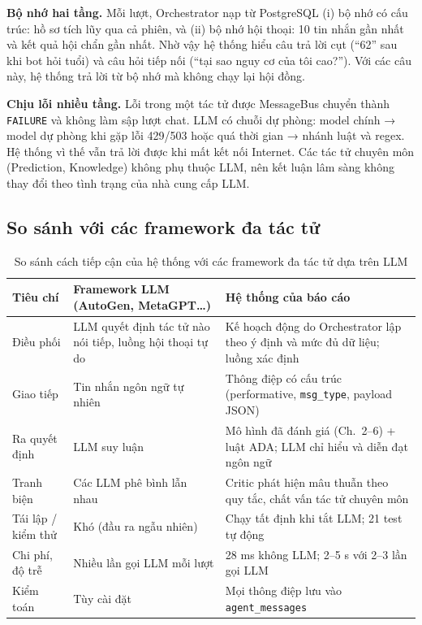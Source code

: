 \textbf{Bộ nhớ hai tầng.} Mỗi lượt, Orchestrator nạp từ PostgreSQL (i) bộ nhớ có cấu trúc: hồ sơ tích lũy qua cả phiên, và (ii) bộ nhớ hội thoại: 10 tin nhắn gần nhất và kết quả hội chẩn gần nhất. Nhờ vậy hệ thống hiểu câu trả lời cụt (``62'' sau khi bot hỏi tuổi) và câu hỏi tiếp nối (``tại sao nguy cơ của tôi cao?''). Với các câu này, hệ thống trả lời từ bộ nhớ mà không chạy lại hội đồng.

\textbf{Chịu lỗi nhiều tầng.} Lỗi trong một tác tử được MessageBus chuyển thành \texttt{FAILURE} và không làm sập lượt chat. LLM có chuỗi dự phòng: model chính → model dự phòng khi gặp lỗi 429/503 hoặc quá thời gian → nhánh luật và regex. Hệ thống vì thế vẫn trả lời được khi mất kết nối Internet. Các tác tử chuyên môn (Prediction, Knowledge) không phụ thuộc LLM, nên kết luận lâm sàng không thay đổi theo tình trạng của nhà cung cấp LLM.

\subsection{So sánh với các framework đa tác tử}

\begin{table}[H]
\centering
\caption{So sánh cách tiếp cận của hệ thống với các framework đa tác tử dựa trên LLM}
\label{tab:mas-compare}
\small
\begin{tabularx}{\linewidth}{@{}L{3.1cm}YY@{}}
\toprule
\textbf{Tiêu chí} & \textbf{Framework LLM (AutoGen, MetaGPT\ldots)} & \textbf{Hệ thống của báo cáo} \\
\midrule
Điều phối & LLM quyết định tác tử nào nói tiếp, luồng hội thoại tự do & Kế hoạch động do Orchestrator lập theo ý định và mức đủ dữ liệu; luồng xác định \\
Giao tiếp & Tin nhắn ngôn ngữ tự nhiên & Thông điệp có cấu trúc (performative, \texttt{msg\_type}, payload JSON) \\
Ra quyết định & LLM suy luận & Mô hình đã đánh giá (Ch.~2–6) + luật ADA; LLM chỉ hiểu và diễn đạt ngôn ngữ \\
Tranh biện & Các LLM phê bình lẫn nhau & Critic phát hiện mâu thuẫn theo quy tắc, chất vấn tác tử chuyên môn \\
Tái lập / kiểm thử & Khó (đầu ra ngẫu nhiên) & Chạy tất định khi tắt LLM; 21 test tự động \\
Chi phí, độ trễ & Nhiều lần gọi LLM mỗi lượt & 28 ms không LLM; 2–5 s với 2–3 lần gọi LLM \\
Kiểm toán & Tùy cài đặt & Mọi thông điệp lưu vào \texttt{agent\_messages} \\
\bottomrule
\end{tabularx}
\end{table}

